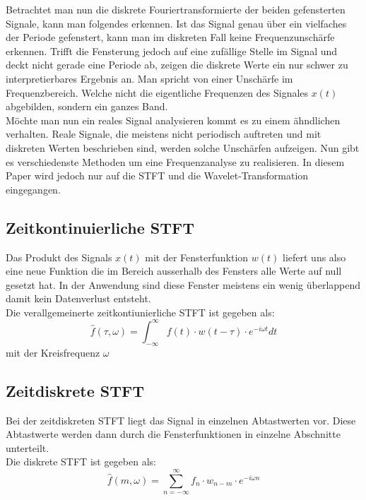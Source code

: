 Betrachtet man nun die diskrete Fouriertransformierte der beiden gefensterten Signale, kann man folgendes erkennen. Ist das Signal genau über ein vielfaches der Periode gefenstert, kann man im diskreten Fall keine Frequenzunschärfe erkennen. Trifft die Fensterung jedoch auf eine zufällige Stelle im Signal und deckt nicht gerade eine Periode ab, zeigen die diskrete Werte ein nur schwer zu interpretierbares Ergebnis an. Man spricht von einer Unschärfe im Frequenzbereich. Welche nicht die eigentliche Frequenzen des Signales $x(t)$ abgebilden, sondern ein ganzes Band.\\
Möchte man nun ein reales Signal analysieren kommt es zu einem ähndlichen verhalten. Reale Signale, die meistens nicht periodisch auftreten und mit diskreten Werten beschrieben sind, werden solche Unschärfen aufzeigen. Nun gibt es verschiedenste Methoden um eine Frequenzanalyse zu realisieren. In diesem Paper wird jedoch nur auf die STFT und die Wavelet-Transformation eingegangen. 


\subsection{Zeitkontinuierliche STFT}

Das Produkt des Signals $x(t)$ mit der Fensterfunktion $w(t) $ liefert uns also eine neue Funktion die im Bereich ausserhalb des Fensters alle Werte auf null gesetzt hat. In der Anwendung sind diese Fenster meistens ein wenig überlappend damit kein Datenverlust entsteht. \\
Die verallgemeinerte zeitkontiunierliche STFT ist  gegeben als:
\begin{equation}
	\hat{f}(\tau, \omega)=\int_{-\infty}^{\infty} f(t)\cdot w(t-\tau)\cdot e^{-i \omega t} dt
\end{equation}
mit der Kreisfrequenz  $\omega $

\subsection{Zeitdiskrete STFT}
Bei der zeitdiskreten STFT liegt das Signal in einzelnen Abtastwerten vor. Diese Abtastwerte werden dann durch die Fensterfunktionen in einzelne Abschnitte unterteilt. \\
Die diskrete STFT ist gegeben als:
\begin{equation}
	\hat{f}(m, \omega)=\sum_{n=-\infty}^{\infty} f_{n} \cdot w_{n-m}\cdot e^{-i \omega n}
\end{equation}



